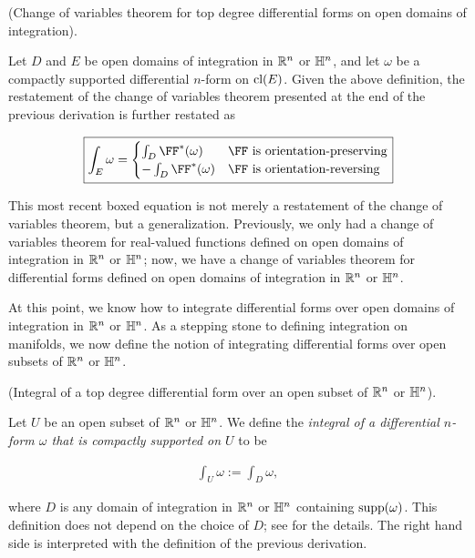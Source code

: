 \begin{theorem}
     (Change of variables theorem for top degree differential forms on open domains of integration).
    
    Let $D$ and $E$ be open domains of integration in $\mathbb{R}^n$ or $\mathbb{H}^n$, and let $\omega$ be a compactly supported differential $n$-form on $\text{cl}(E)$. Given the above definition, the restatement of the change of variables theorem presented at the end of the previous derivation is further restated as
    
    \begin{align*}
        \boxed
        {
            \int_E \omega
            =
            \begin{cases}
                \int_D \FF^*(\omega) & \text{$\FF$ is orientation-preserving} \\
                -\int_D \FF^*(\omega) & \text{$\FF$ is orientation-reversing}
            \end{cases}
        }
    \end{align*}
    
    This most recent boxed equation is not merely a restatement of the change of variables theorem, but a generalization. Previously, we only had a change of variables theorem for real-valued functions defined on open domains of integration in $\mathbb{R}^n$ or $\mathbb{H}^n$; now, we have a change of variables theorem for differential forms defined on open domains of integration in $\mathbb{R}^n$ or $\mathbb{H}^n$.
\end{theorem}

At this point, we know how to integrate differential forms over open domains of integration in $\mathbb{R}^n$ or $\mathbb{H}^n$. As a stepping stone to defining integration on manifolds, we now define the notion of integrating differential forms over open subsets of $\mathbb{R}^n$ or $\mathbb{H}^n$.

\begin{defn}
    \label{ch::diff_forms::defn::integral_over_open_subset}
    
     (Integral of a top degree differential form over an open subset of $\mathbb{R}^n$ or $\mathbb{H}^n$).
    
    Let $U$ be an open subset of $\mathbb{R}^n$ or $\mathbb{H}^n$. We define the \textit{integral of a differential $n$-form $\omega$ that is compactly supported on $U$} to be
    
    \begin{align*}
        \int_U \omega := \int_D \omega,
    \end{align*}
    
    where $D$ is any domain of integration in $\mathbb{R}^n$ or $\mathbb{H}^n$ containing $\text{supp}(\omega)$. This definition does not depend on the choice of $D$; see \cite[p. 403]{book::SM} for the details. The right hand side is interpreted with the definition of the previous derivation. 
\end{defn}

